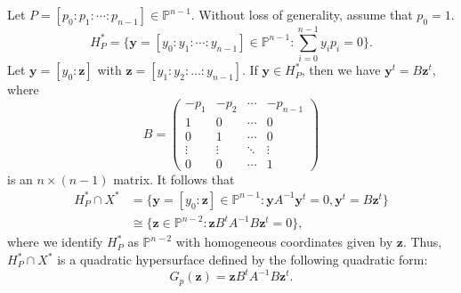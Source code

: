 \documentclass[12pt,reqno]{amsart}
\theoremstyle{definition}
\begin{document}
Let $P=[p_0:p_1:\cdots:p_{n-1}] \in \mathbb{P}^{n-1}$. Without loss of generality, assume that $p_0=1$.
$$
H_P^*=\bigg\{\mathbf{y}=[y_0:y_1:\cdots:y_{n-1}] \in \mathbb{P}^{n-1}: \sum_{i=0}^{n-1} y_ip_i=0\bigg\}.
$$
Let $\mathbf{y}=[y_0:\mathbf{z}]$ with $\mathbf{z}=[y_1:y_2:\ldots: y_{n-1}]$. If $\mathbf{y} \in H_{P}^*$, then we have $\mathbf{y}^t=B\mathbf{z}^t$, where
$$
B=
\begin{pmatrix} 
-p_1&-p_2&\cdots &-p_{n-1}\\
1&0&\cdots&0\\
0&1&\cdots&0\\
\vdots&\vdots&\ddots&\vdots\\
0&0&\cdots&1
\end{pmatrix}
$$
is an $n\times (n-1)$ matrix. It follows that 
\begin{align*}
H_P^* \cap X^*
&=\{\mathbf{y}=[y_0:\mathbf{z}] \in \mathbb{P}^{n-1}: \mathbf{y}A^{-1}\mathbf{y}^t=0, \mathbf{y}^t=B\mathbf{z}^t\}\\
&\cong \{\mathbf{z} \in \mathbb{P}^{n-2}: \mathbf{z}B^tA^{-1}B\mathbf{z}^t=0\},
\end{align*}
where we identify $H_{P}^{\ast}$ as $\mathbb{P}^{n-2}$ with homogeneous coordinates given by $\mathbf{z}$. Thus, $H_P^{\ast}\cap X^{\ast}$ is a quadratic hypersurface defined by the following quadratic form:
$$
G_p(\mathbf{z})=\mathbf{z}B^tA^{-1}B\mathbf{z}^t.
$$
\end{document}
